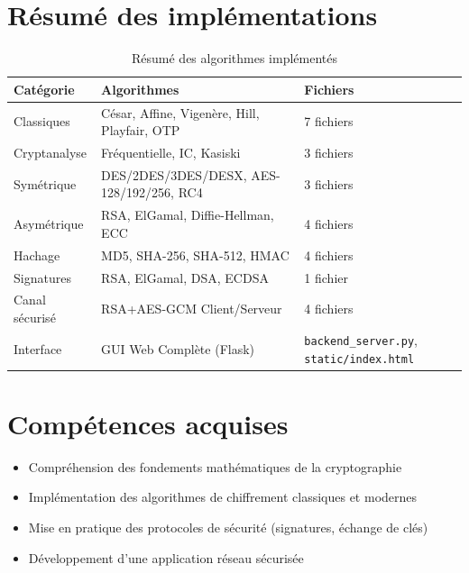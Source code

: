 \documentclass[12pt,a4paper]{report}
\begin{document}
\section{Résumé des implémentations}
\begin{table}[H]
\centering
\begin{tabular}{|l|l|l|}
\hline
\textbf{Catégorie} & \textbf{Algorithmes} & \textbf{Fichiers} \\
\hline
Classiques & César, Affine, Vigenère, Hill, Playfair, OTP & 7 fichiers \\
\hline
Cryptanalyse & Fréquentielle, IC, Kasiski & 3 fichiers \\
\hline
Symétrique & DES/2DES/3DES/DESX, AES-128/192/256, RC4 & 3 fichiers \\
\hline
Asymétrique & RSA, ElGamal, Diffie-Hellman, ECC & 4 fichiers \\
\hline
Hachage & MD5, SHA-256, SHA-512, HMAC & 4 fichiers \\
\hline
Signatures & RSA, ElGamal, DSA, ECDSA & 1 fichier \\
\hline
Canal sécurisé & RSA+AES-GCM Client/Serveur & 4 fichiers \\
Interface & GUI Web Complète (Flask) & \texttt{backend\_server.py}, \texttt{static/index.html} \\
\hline
\end{tabular}
\caption{Résumé des algorithmes implémentés}
\end{table}

\section{Compétences acquises}
\begin{itemize}
    \item Compréhension des fondements mathématiques de la cryptographie
    \item Implémentation des algorithmes de chiffrement classiques et modernes
    \item Mise en pratique des protocoles de sécurité (signatures, échange de clés)
    \item Développement d'une application réseau sécurisée
\end{itemize}
\end{document}
